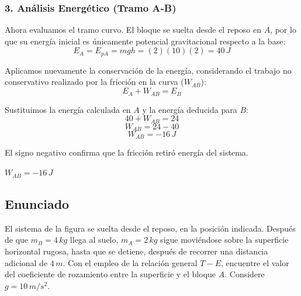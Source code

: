 \documentclass[12pt, a4paper]{article}
\begin{document}
\subsubsection*{3. Análisis Energético (Tramo A-B)}
Ahora evaluamos el tramo curvo. El bloque se suelta desde el reposo en $A$, por lo que su energía inicial es únicamente potencial gravitacional respecto a la base:
$$ E_A = E_{pA} = mgh = (2)(10)(2) = 40 \, \si{J} $$

Aplicamos nuevamente la conservación de la energía, considerando el trabajo no conservativo realizado por la fricción en la curva ($W_{AB}$):
$$ E_A + W_{AB} = E_B $$

Sustituimos la energía calculada en $A$ y la energía deducida para $B$:
$$ 40 + W_{AB} = 24 $$
$$ W_{AB} = 24 - 40 $$
$$ W_{AB} = -16 \, \si{J} $$

El signo negativo confirma que la fricción retiró energía del sistema.

\begin{tcolorbox}[colback=green!5!white, colframe=green!50!black, title=Respuesta Final]
\centering \Large $W_{AB} = -16 \, \si{J}$
\end{tcolorbox}

\newpage

\subsection*{Enunciado}
El sistema de la figura se suelta desde el reposo, en la posición indicada. Después de que $m_B = 4 \, \si{kg}$ llega al suelo, $m_A = 2 \, \si{kg}$ sigue moviéndose sobre la superficie horizontal rugosa, hasta que se detiene, después de recorrer una distancia adicional de $4 \, \si{m}$. Con el empleo de la relación general $T - E$, encuentre el valor del coeficiente de rozamiento entre la superficie y el bloque $A$. Considere $g = 10 \, \si{m/s^2}$.

\begin{center}
\end{center}
\end{document}
